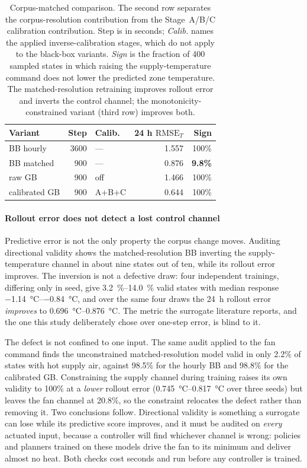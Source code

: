 \documentclass[5p]{elsarticle}
\newcommand{\RMSE}{\ensuremath{\mathrm{RMSE}}}
\begin{document}
\begin{table}[t]
\centering
\small
\begin{tabular}{@{}lrlrr@{}}
\toprule
Variant & Step & Calib. & 24 h $\RMSE_T$ & Sign \\
\midrule
BB hourly & 3600 & --- & 1.557 & 100\% \\
BB matched & 900 & --- & 0.876 & \textbf{9.8\%} \\
raw GB & 900 & off & 1.466 & 100\% \\
calibrated GB & 900 & A+B+C & 0.644 & 100\% \\
\bottomrule
\end{tabular}
\caption{Corpus-matched comparison. The second row separates the corpus-resolution contribution
from the Stage~A/B/C calibration contribution. Step is in seconds; \emph{Calib.} names the
applied inverse-calibration stages, which do not apply to the black-box variants.
\emph{Sign} is the fraction of 400 sampled
states in which raising the supply-temperature command does not lower the predicted zone
temperature. The matched-resolution retraining improves rollout error and inverts the control
channel; the monotonicity-constrained variant (third row) improves both.}
\label{tab:matched}
\end{table}

\paragraph{Rollout error does not detect a lost control channel}
Predictive error is not the only property the corpus change moves. Auditing directional validity
shows the matched-resolution BB inverting the supply-temperature channel in about nine states out of
ten, while its rollout error improves. The inversion is not a defective draw: four independent
trainings, differing only in seed, give \SIrange{3.2}{14.0}{\percent} valid states with median
response \SIrange{-1.14}{-0.84}{\celsius}, and over the same four draws the 24~h rollout error
\emph{improves} to \SIrange{0.696}{0.876}{\celsius}. The metric the surrogate literature reports,
and the one this study deliberately chose over one-step error, is blind to it.

The defect is not confined to one input. The same audit applied to the fan command finds the
unconstrained matched-resolution model valid in only 2.2\% of states with hot supply air, against
98.5\% for the hourly BB and 98.8\% for the calibrated GB. Constraining the supply channel during
training raises its own validity to 100\% at a \emph{lower} rollout error
(\SIrange{0.745}{0.817}{\celsius} over three seeds) but leaves the fan channel at 20.8\%, so the
constraint relocates the defect rather than removing it. Two conclusions follow. Directional
validity is something a surrogate can lose while its predictive score improves, and it must be
audited on \emph{every} actuated input, because a controller will find whichever channel is wrong:
policies and planners trained on these models drive the fan to its minimum and deliver almost no
heat. Both checks cost seconds and run before any controller is trained.
\end{document}
